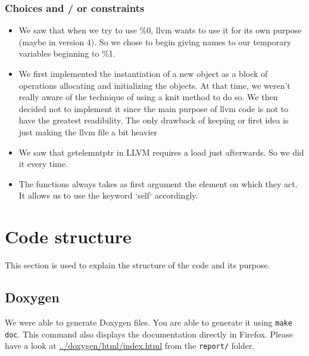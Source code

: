 \documentclass[a4paper,11pt]{article}
\begin{document}
  \subsubsection{Choices and / or constraints}
    \begin{itemize}
    \item We saw that when we try to use \%0, llvm wants to use it for its own purpose (maybe in version 4). So we chose to begin
    giving names to our temporary variables beginning to \%1.
    \item We first implemented the instantiation of a new object as a block of operations allocating and initializing the objects. 
    At that time, we weren't really aware of the technique of using a knit method to do so. We then decided not to implement it
    since the main purpose of llvm code is not to have the greatest readibility. The only drawback of keeping or first idea is just making the llvm file a bit heavier
    \item We saw that getelemntptr in LLVM requires a load just afterwards. So we did it every time.
    \item The functions always takes as first argument the element on which they act. It allows us to use the keyword `self` accordingly.
    \end{itemize}

  \section{Code structure}
    This section is used to explain the structure of the code and its purpose.

\subsection{Doxygen}
  \label{Doxygen}
  We were able to generate Doxygen files. You are able to generate it using \texttt{make doc}. This command also displays the documentation directly in Firefox.
  Please have a look at \url{../doxygen/html/index.html} from the \texttt{report/} folder.
\end{document}
